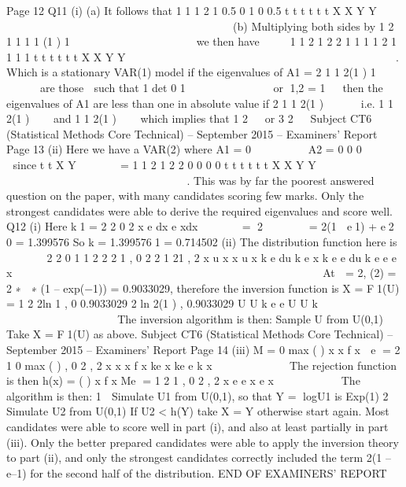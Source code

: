     Page 12
  Q11 (i) (a) It follows that
  1
  1
  1 2
  1 0.5 0
  1 0 0.5
  t t t
  t t t
  X X
  Y Y
  
  
          
                      
  (b) Multiplying both sides by
  1
  2
  1 1 1
  1 (1 ) 1
      
           
  we then have
     
  1
  1
  2 1 2 2
  1 1 1 1
  2 1 1 1 1
  t t t
  t t t
  X X
  Y Y
  
  
         
                       
  
  
  .
  Which is a stationary VAR(1) model if the eigenvalues of
  A1 = 2
  1 1
  2(1 ) 1
   
       
  are those  such that
  1
  det 0
  1
      
        
  or 1,2 = 1  
  then the eigenvalues of A1 are less than one in absolute value if
  2
  1 1
  2(1 )
   
  
   
  i.e.
  1 1
  2(1 )
  
   
  and
  1 1
  2(1 )
  
   
  which implies that 1
  2
    or 3
  2
   
  Subject CT6 (Statistical Methods Core Technical) – September 2015 – Examiners’ Report
  Page 13
  (ii) Here we have a VAR(2) where
  A1 =
    0
   
      
  A2 =
    0 0
  0
   
     
  since
  t
  t
  X
  Y
   
   
   
  =
    1
  1 2
  1 2 2
  0 0
  0 0
  t t t
  t t t
  X X
  Y Y
   
   
         
                      
  
  
  .
  This was by far the poorest answered question on the paper, with many
  candidates scoring few marks. Only the strongest candidates were able to
  derive the required eigenvalues and score well.
  Q12 (i) Here k1 = 2
  2
  0 2
  x
  e dx e xdx
        = 􀵆2 􀝁􀬿􁈺􀳣
  􀰮􁈻􁉃
  􀬶
  􀮶
  = 2(1  e1) + e2  0
  = 1.399576
  So k = 1.3995761 = 0.714502
  (ii) The distribution function here is
       
  2 2
  0
  1 1 2
  2
  2 1 , 0 2
  2 1 21 , 2
  x u x
  x
  u x
  k e du k e x
  k e e du k e e e x
   
      
    
        
        
    
                 
  
  
  At 􀝔 = 2, (2) = 2 ∗ 􀝇 ∗ (1 – exp(−1)) = 0.9033029, therefore the inversion
  function is
  X = F1(U) =
    1 2
  2ln 1 , 0 0.9033029
  2
  ln 2(1 ) , 0.9033029
  U U
  k
  e e U U
  k
   
             
  
              
  The inversion algorithm is then:
    Sample U from U(0,1)
  Take X = F1(U) as above.
  Subject CT6 (Statistical Methods Core Technical) – September 2015 – Examiners’ Report
  Page 14
  (iii) M =
    0
  max ( ) x x
  f x
   e
  = 2 1
  0
  max ( ) , 0 2
  , 2
  x
  x x
  f x ke x ke
  e k x
  
   
  
     
   
  The rejection function is then
  h(x) = ( )
  x
  f x
  Me =
    1 2
  1
  , 0 2
  , 2
  x
  e e x
  e x
  
  
  
    
    
  The algorithm is then:
    1  Simulate U1 from U(0,1), so that Y = logU1 is Exp(1)
  2  Simulate U2 from U(0,1)
  If U2 < h(Y) take X = Y otherwise start again.
  Most candidates were able to score well in part (i), and also at least partially
  in part (iii). Only the better prepared candidates were able to apply the
  inversion theory to part (ii), and only the strongest candidates correctly
  included the term 2(1 – e–1) for the second half of the distribution.
  END OF EXAMINERS’ REPORT
